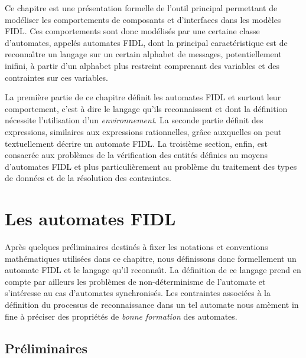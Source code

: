 %
 
Ce chapitre est une pr\'esentation formelle de l'outil principal
permettant de mod\'eliser les comportements de composants et
d'interfaces dans les mod\`eles \textsf{FIDL}. Ces comportements sont
donc mod\'elis\'es par une certaine classe d'automates, appel\'es
automates \textsf{FIDL}, dont la principal caract\'eristique est de
reconna\^{\i}tre un langage sur un certain alphabet de messages,
potentiellement inifini, \`a partir d'un
alphabet plus restreint comprenant des variables et des contraintes sur
ces variables. 

La premi\`ere partie de ce chapitre d\'efinit les automates
\textsf{FIDL} et surtout leur comportement, c'est \`a dire le langage
qu'ils reconnaissent et dont la d\'efinition n\'ecessite
l'utilisation d'un \emph{environnement}. La seconde partie d\'efinit
des expressions, similaires aux expressions rationnelles, gr\^ace
auxquelles on peut textuellement d\'ecrire un automate
\textsf{FIDL}. La troisi\`eme section, enfin, est consacr\'ee aux
probl\`emes de la v\'erification des entit\'es d\'efinies au
moyens d'automates FIDL et plus particuli\`erement au probl\`eme
du traitement  des types de donn\'ees et de la r\'esolution des
contraintes. 

\section{Les automates \textsf{FIDL}}
\label{sec:les-automates-fidl}

Apr\`es quelques pr\'eliminaires destin\'es \`a fixer les
notations et conventions math\'ematiques utilis\'ees dans ce
chapitre, nous d\'efinissons donc formellement un automate
\textsf{FIDL} et le langage qu'il reconna\^{\i}t. La d\'efinition  de
ce langage prend en compte par ailleurs les probl\`emes de
non-d\'eterminisme de l'automate et s'int\'eresse au cas d'automates
synchronis\'es. Les contraintes associ\'ees \`a la d\'efinition du
processus de reconnaissance dans un tel automate nous am\`ement in
fine \`a pr\'eciser des propri\'et\'es de \emph{bonne formation}
des automates.

\subsection{Pr\'eliminaires}
\label{sec:notations}

